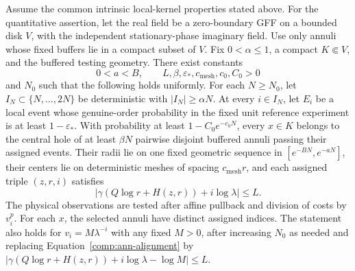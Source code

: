 \begin{lemma}
\label{comp:ann-coverage}
Assume the common intrinsic local-kernel properties stated above.
For the quantitative assertion, let the real field be a zero-boundary
GFF on a bounded disk $V$, with the independent stationary-phase
imaginary field.  Use only annuli whose fixed buffers lie in a compact
subset of $V$.
Fix $0<\alpha\leq1$, a compact $K\Subset V$, and the buffered testing
geometry.  There exist constants
\[
 0<a<B,\qquad L,\beta,\varepsilon_*,c_{\mathrm{mesh}},c_0,C_0>0
\]
and $N_0$ such that the following holds uniformly.  For each
$N\geq N_0$, let $I_N\subset\{N,\ldots,2N\}$ be deterministic with
$|I_N|\geq\alpha N$.  At every $i\in I_N$, let $E_i$ be a local event
whose genuine-order probability in the fixed unit reference experiment
is at least $1-\varepsilon_*$.  With probability at least
$1-C_0e^{-c_0N}$, every $x\in K$ belongs to the central hole of at
least $\beta N$ pairwise disjoint buffered annuli passing their assigned
events.  Their radii lie on one fixed geometric sequence in
$[e^{-BN},e^{-aN}]$, their centers lie on deterministic meshes of spacing
$c_{\mathrm{mesh}}r$, and each assigned triple $(z,r,i)$ satisfies
\begin{equation}\label{comp:ann-alignment}
 |\gamma(Q\log r+H(z,r))+i\log\lambda|\leq L.
\end{equation}
The physical observations are tested after affine pullback and division
of costs by $v_i^p$.  For each $x$, the selected annuli have distinct
assigned indices.  The statement also holds for $v_i=M\lambda^{-i}$ with any fixed
$M>0$, after increasing $N_0$ as needed and replacing
Equation~\eqref{comp:ann-alignment} by
$|\gamma(Q\log r+H(z,r))+i\log\lambda-\log M|\le L$.
\end{lemma}

